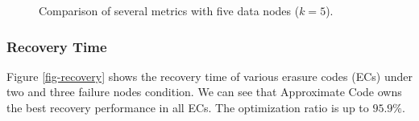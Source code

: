 \documentclass[sigconf]{acmart}
\begin{document}
\begin{figure}[!ht]
\hspace{-2mm}
\vspace{-3mm}
\caption{Comparison of several metrics with five data nodes ($k=5$).}\label{fig-BAR}
\vspace{-3mm}
\end{figure}

\subsubsection{Recovery Time}

Figure \ref{fig-recovery} shows the recovery time of various erasure codes (ECs) under two and three failure nodes
condition. We can see that Approximate Code owns the best recovery performance in all ECs. The optimization ratio is up to $95.9\%$.
\end{document}
